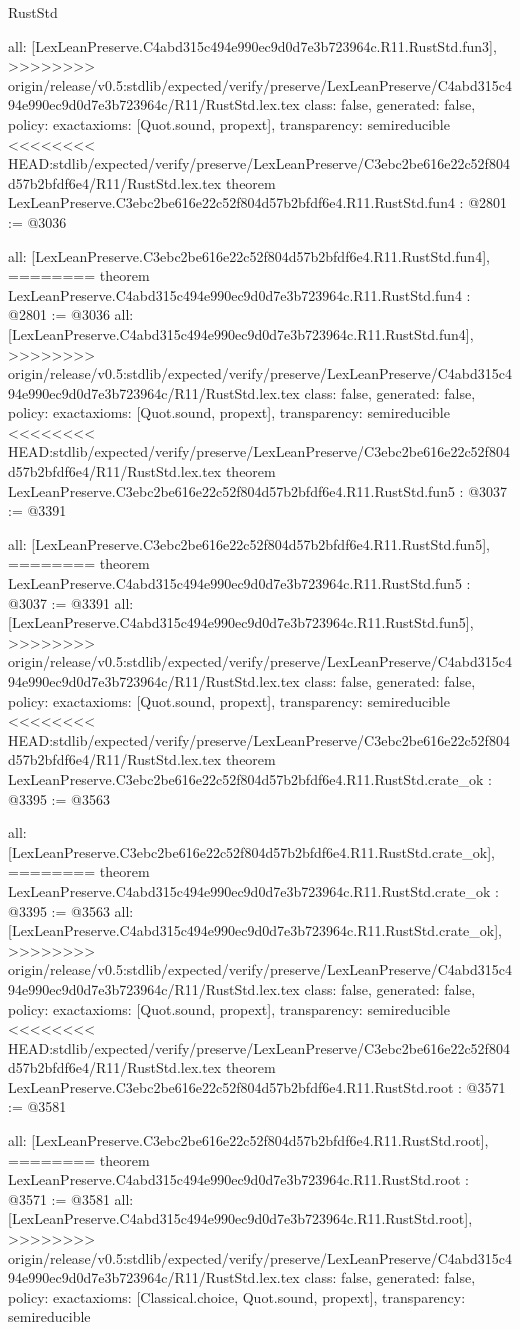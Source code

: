 \begin{lexlean}{RustStd}
\begin{coremodule}
{\begin{coremodule}
{{{{{{{  all: [LexLeanPreserve.C4abd315c494e990ec9d0d7e3b723964c.R11.RustStd.fun3],
>>>>>>>> origin/release/v0.5:stdlib/expected/verify/preserve/LexLeanPreserve/C4abd315c494e990ec9d0d7e3b723964c/R11/RustStd.lex.tex
  class: false,
  generated: false,
  policy: exact{axioms: [Quot.sound, propext]},
  transparency: semireducible
}
<<<<<<<< HEAD:stdlib/expected/verify/preserve/LexLeanPreserve/C3ebc2be616e22c52f804d57b2bfdf6e4/R11/RustStd.lex.tex
theorem LexLeanPreserve.C3ebc2be616e22c52f804d57b2bfdf6e4.R11.RustStd.fun4 : @2801 := @3036 {
  all: [LexLeanPreserve.C3ebc2be616e22c52f804d57b2bfdf6e4.R11.RustStd.fun4],
========
theorem LexLeanPreserve.C4abd315c494e990ec9d0d7e3b723964c.R11.RustStd.fun4 : @2801 := @3036 {
  all: [LexLeanPreserve.C4abd315c494e990ec9d0d7e3b723964c.R11.RustStd.fun4],
>>>>>>>> origin/release/v0.5:stdlib/expected/verify/preserve/LexLeanPreserve/C4abd315c494e990ec9d0d7e3b723964c/R11/RustStd.lex.tex
  class: false,
  generated: false,
  policy: exact{axioms: [Quot.sound, propext]},
  transparency: semireducible
}
<<<<<<<< HEAD:stdlib/expected/verify/preserve/LexLeanPreserve/C3ebc2be616e22c52f804d57b2bfdf6e4/R11/RustStd.lex.tex
theorem LexLeanPreserve.C3ebc2be616e22c52f804d57b2bfdf6e4.R11.RustStd.fun5 : @3037 := @3391 {
  all: [LexLeanPreserve.C3ebc2be616e22c52f804d57b2bfdf6e4.R11.RustStd.fun5],
========
theorem LexLeanPreserve.C4abd315c494e990ec9d0d7e3b723964c.R11.RustStd.fun5 : @3037 := @3391 {
  all: [LexLeanPreserve.C4abd315c494e990ec9d0d7e3b723964c.R11.RustStd.fun5],
>>>>>>>> origin/release/v0.5:stdlib/expected/verify/preserve/LexLeanPreserve/C4abd315c494e990ec9d0d7e3b723964c/R11/RustStd.lex.tex
  class: false,
  generated: false,
  policy: exact{axioms: [Quot.sound, propext]},
  transparency: semireducible
}
<<<<<<<< HEAD:stdlib/expected/verify/preserve/LexLeanPreserve/C3ebc2be616e22c52f804d57b2bfdf6e4/R11/RustStd.lex.tex
theorem LexLeanPreserve.C3ebc2be616e22c52f804d57b2bfdf6e4.R11.RustStd.crate_ok : @3395 := @3563 {
  all: [LexLeanPreserve.C3ebc2be616e22c52f804d57b2bfdf6e4.R11.RustStd.crate_ok],
========
theorem LexLeanPreserve.C4abd315c494e990ec9d0d7e3b723964c.R11.RustStd.crate_ok : @3395 := @3563 {
  all: [LexLeanPreserve.C4abd315c494e990ec9d0d7e3b723964c.R11.RustStd.crate_ok],
>>>>>>>> origin/release/v0.5:stdlib/expected/verify/preserve/LexLeanPreserve/C4abd315c494e990ec9d0d7e3b723964c/R11/RustStd.lex.tex
  class: false,
  generated: false,
  policy: exact{axioms: [Quot.sound, propext]},
  transparency: semireducible
}
<<<<<<<< HEAD:stdlib/expected/verify/preserve/LexLeanPreserve/C3ebc2be616e22c52f804d57b2bfdf6e4/R11/RustStd.lex.tex
theorem LexLeanPreserve.C3ebc2be616e22c52f804d57b2bfdf6e4.R11.RustStd.root : @3571 := @3581 {
  all: [LexLeanPreserve.C3ebc2be616e22c52f804d57b2bfdf6e4.R11.RustStd.root],
========
theorem LexLeanPreserve.C4abd315c494e990ec9d0d7e3b723964c.R11.RustStd.root : @3571 := @3581 {
  all: [LexLeanPreserve.C4abd315c494e990ec9d0d7e3b723964c.R11.RustStd.root],
>>>>>>>> origin/release/v0.5:stdlib/expected/verify/preserve/LexLeanPreserve/C4abd315c494e990ec9d0d7e3b723964c/R11/RustStd.lex.tex
  class: false,
  generated: false,
  policy: exact{axioms: [Classical.choice, Quot.sound, propext]},
  transparency: semireducible
}

}}}}}}}}}}
\end{coremodule}}
\end{coremodule}
\end{lexlean}

